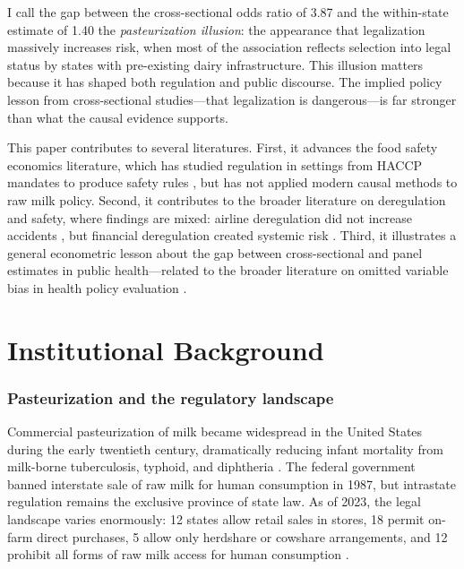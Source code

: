 \documentclass[12pt]{article}
\begin{document}
I call the gap between the cross-sectional odds ratio of 3.87 and the within-state estimate of 1.40 the \textit{pasteurization illusion}: the appearance that legalization massively increases risk, when most of the association reflects selection into legal status by states with pre-existing dairy infrastructure. This illusion matters because it has shaped both regulation and public discourse. The implied policy lesson from cross-sectional studies---that legalization is dangerous---is far stronger than what the causal evidence supports.

This paper contributes to several literatures. First, it advances the food safety economics literature, which has studied regulation in settings from HACCP mandates \citep{Ollinger2004} to produce safety rules \citep{Adalja2015}, but has not applied modern causal methods to raw milk policy. Second, it contributes to the broader literature on deregulation and safety, where findings are mixed: airline deregulation did not increase accidents \citep{Rose1992}, but financial deregulation created systemic risk \citep{Barth2004}. Third, it illustrates a general econometric lesson about the gap between cross-sectional and panel estimates in public health---related to the broader literature on omitted variable bias in health policy evaluation \citep{Angrist2009}.


\section{Institutional Background}

\subsubsection*{Pasteurization and the regulatory landscape} Commercial pasteurization of milk became widespread in the United States during the early twentieth century, dramatically reducing infant mortality from milk-borne tuberculosis, typhoid, and diphtheria \citep{Olmstead2004}. The federal government banned interstate sale of raw milk for human consumption in 1987, but intrastate regulation remains the exclusive province of state law. As of 2023, the legal landscape varies enormously: 12 states allow retail sales in stores, 18 permit on-farm direct purchases, 5 allow only herdshare or cowshare arrangements, and 12 prohibit all forms of raw milk access for human consumption \citep{FTCLDF2024}.
\end{document}

